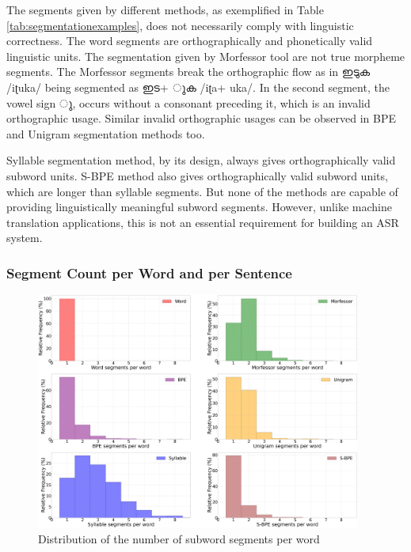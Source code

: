 The segments given by different methods, as exemplified in Table
\ref{tab:segmentationexamples}, does not necessarily comply with linguistic
correctness. The word segments are orthographically and phonetically valid
linguistic units. The segmentation given by Morfessor tool are not true
morpheme segments. The Morfessor segments break the orthographic flow as in
    {\mal ഇടുക} {\ipa /iʈuka/} being segmented as {\mal ഇട+ ുക} {\ipa /iʈa+ uka/}. In
the second segment, the vowel sign {\mal ു}, occurs without a consonant
preceding it, which is an invalid orthographic usage. Similar invalid
orthographic usages can be observed in BPE and Unigram segmentation methods
too.

Syllable segmentation method, by its design, always gives orthographically
valid subword units. S-BPE method also gives orthographically valid subword
units, which are longer than syllable segments. But none of the methods are
capable of providing linguistically meaningful subword segments. However,
unlike machine translation applications, this is not an essential requirement
for building an ASR system.

\subsubsection{Segment Count per Word and per Sentence}

\begin{figure}[htpb]
    \centering
    \includegraphics[width=0.95\textwidth]{segmentsperword.png}
    \caption{Distribution of the number of subword segments per word}
    \label{fig:histogram-wordlength}
\end{figure}


